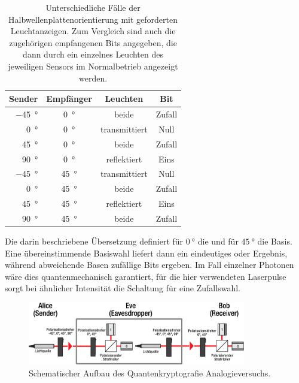 \begin{table}
	\centering
	\caption{Unterschiedliche Fälle der Halbwellenplattenorientierung mit geforderten Leuchtanzeigen.
			 Zum Vergleich sind auch die zugehörigen empfangenen Bits angegeben, die dann durch ein einzelnes
			 Leuchten des jeweiligen Sensors im Normalbetrieb angezeigt werden.}
	\label{tab:kombination}
	\begin{tabular}{rccc}
		\toprule
		Sender & Empfänger & Leuchten & Bit \\
		\midrule
		\qty{-45}{\degree}\hspace{1ex} & \qty{0}{\degree} & beide & Zufall \\
		\qty{  0}{\degree}\hspace{1ex} & \qty{0}{\degree} & transmittiert & Null \\
		\qty{ 45}{\degree}\hspace{1ex} & \qty{0}{\degree} & beide & Zufall \\
		\qty{ 90}{\degree}\hspace{1ex} & \qty{0}{\degree} & reflektiert & Eins \\
		\qty{-45}{\degree}\hspace{1ex} & \qty{45}{\degree} & transmittiert & Null \\
		\qty{  0}{\degree}\hspace{1ex} & \qty{45}{\degree} & beide & Zufall \\
		\qty{ 45}{\degree}\hspace{1ex} & \qty{45}{\degree} & reflektiert & Eins \\
		\qty{ 90}{\degree}\hspace{1ex} & \qty{45}{\degree} & beide & Zufall \\
		\bottomrule
	\end{tabular}
\end{table}

Die darin beschriebene Übersetzung definiert für $\qty{0}{\degree}$ die \glqq{$+$}\grqq{} und für $\qty{45}{\degree}$ die
\glqq{$\times$}\grqq{} Basis. Eine übereinstimmende Basiswahl liefert dann ein eindeutiges \grqq{} oder \grqq{}
Ergebnis, während abweichende Basen zufällige Bits ergeben. Im Fall einzelner Photonen wäre dies quantenmechanisch garantiert,
für die hier verwendeten Laserpulse sorgt bei ähnlicher Intensität die Schaltung für eine Zufallswahl.

\begin{figure}[H]
	\centering
	\includegraphics[width=0.85\textwidth]{content/aufbau/schema.pdf}
	\caption{Schematischer Aufbau des Quantenkryptografie Analogieversuchs. \cite{krypt}}
	\label{fig:schema}
\end{figure}

